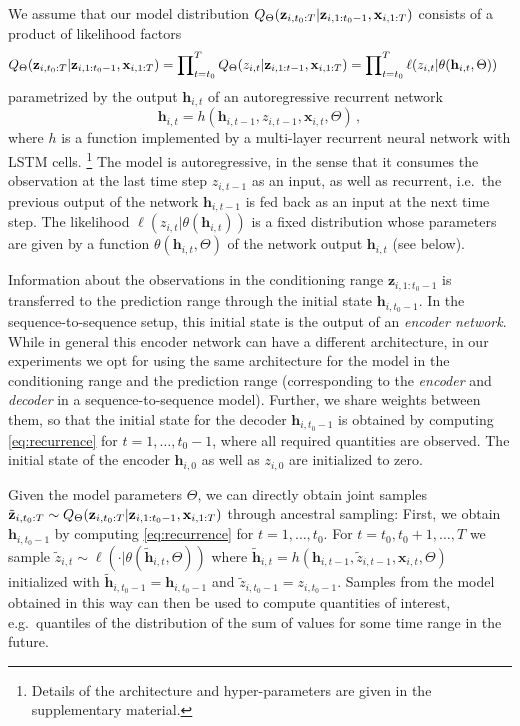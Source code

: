 \documentclass{article}
\newcommand{\z}[2]{z_{#1, #2}}
\newcommand{\xbf}{\mathbf{x}}
\newcommand{\zVec}[3]{\mathbf{z}_{#1, #2:#3}}
\newcommand{\xVec}[3]{\mathbf{x}_{#1, #2:#3}}
\newcommand{\hVec}{\mathbf{h}}
\begin{document}
We assume that our model distribution $\modelDist$
consists of a product of likelihood factors
\begin{align*}
\modelDist &= \prod\nolimits_{t=t_0}^T Q_\Theta(z_{i,t}|\mathbf{z}_{i,1:t-1}, \xVec{i}{1}{T}) = \prod\nolimits_{t=t_0}^T \ell(\z{i}{t} | \theta(\hVec_{i, t}, \Theta))
\end{align*}
parametrized by the output $\hVec_{i, t}$ of an autoregressive recurrent network
\begin{equation}
\hVec_{i, t} = h\left(\hVec_{i, t-1}, \z{i}{t-1}, \xbf_{i, t}, \Theta\right) \,,
\label{eq:recurrence}
\end{equation}
where $h$ is a function implemented by a multi-layer recurrent neural network with LSTM cells.%
\footnote{Details of the architecture and hyper-parameters are given in the supplementary material.}
The model is autoregressive, in the sense that it consumes the observation at the last time step $\z{i}{t-1}$ as an input,
as well as recurrent, i.e.\ the previous output of the network $\hVec_{i,t-1}$ is fed back as an input at the next time step.
The likelihood $\ell(\z{i}{t}|\theta(\hVec_{i,t}))$ is a fixed distribution
whose parameters are given by a function $\theta(\hVec_{i,t}, \Theta)$ of the network output $\hVec_{i, t}$ (see below).

Information about the observations in the conditioning range $\zVec{i}{1}{t_0 -1}$ is transferred to the
prediction range through the initial state $\hVec_{i, t_0-1}$. In the sequence-to-sequence setup, this initial state is
the output of an \emph{encoder network}. While in general this encoder network can have a different architecture, in our 
experiments we opt for using the
same architecture for the model in the conditioning range and the prediction range (corresponding to the \emph{encoder} and \emph{decoder} in
a sequence-to-sequence model). Further, we share weights between them, so that the initial state
for the decoder $\hVec_{i, t_0 - 1}$ is
obtained by computing \eqref{eq:recurrence} for $t = 1, \ldots, t_0 - 1$, where all required quantities are observed.
The initial state of the encoder $\hVec_{i, 0}$ as well as $\z{i}{0}$ are initialized to zero.

Given the model parameters $\Theta$, we can directly obtain joint samples
$\tilde{\mathbf{z}}_{i, t_0:T} \sim \modelDist$ through ancestral sampling:
First, we obtain $\hVec_{i, t_0-1}$ by computing \eqref{eq:recurrence} for $t=1,\ldots, t_0$.
For $t=t_0, t_0+1, \ldots, T$ we sample $\tilde{z}_{i, t} \sim \ell(\cdot | \theta(\tilde{\mathbf{h}}_{i,t}, \Theta))$
where $\tilde{\mathbf{h}}_{i, t} = h\left(\hVec_{i, t-1}, \tilde{z}_{i, t-1}, \xbf_{i, t}, \Theta\right)$
initialized with $\tilde{\mathbf{h}}_{i, t_0-1} = \hVec_{i, t_0-1}$ and $\tilde{z}_{i, t_0 -1} = \z{i}{t_0 - 1}$.
Samples from the model obtained in this way can then be used to compute quantities
of interest, e.g.\ quantiles of the distribution of the sum of values for some
time range in the future.
\end{document}
